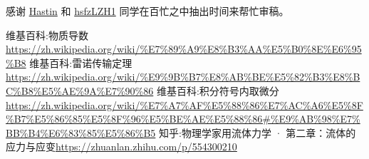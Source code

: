 \documentclass[fontset=windows]{article}
\begin{document}
感谢 \href{https://hastin-blog.cn/}{Hastin} 和 \href{https://github.com/hsfzLZH1}{hsfzLZH1} 同学在百忙之中抽出时间来帮忙审稿。

\begin{thebibliography}{30}

     维基百科:物质导数\url{https://zh.wikipedia.org/wiki/%E7%89%A9%E8%B3%AA%E5%B0%8E%E6%95%B8} 
     维基百科:雷诺传输定理\url{https://zh.wikipedia.org/wiki/%E9%9B%B7%E8%AB%BE%E5%82%B3%E8%BC%B8%E5%AE%9A%E7%90%86} 
     维基百科:积分符号内取微分\url{https://zh.wikipedia.org/wiki/%E7%A7%AF%E5%88%86%E7%AC%A6%E5%8F%B7%E5%86%85%E5%8F%96%E5%BE%AE%E5%88%86#%E9%AB%98%E7%BB%B4%E6%83%85%E5%86%B5}
     知乎:物理学家用流体力学 · 第二章：流体的应力与应变\url{https://zhuanlan.zhihu.com/p/554300210}


\end{thebibliography}
\end{document}
